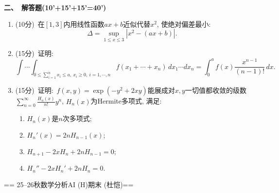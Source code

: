 \textbf{二、\ 解答题(10'+15'+15'=40')}
\begin{enumerate}
    \item (10分)\ 在$[1,3]$内用线性函数$ax+b$近似代替$x^2$, 使绝对偏差最小:
    $$\Delta=\sup_{1\leq x\leq3}|x^2-(ax+b)|.$$
    \item (15分)\ 证明:
    $$\int\cdots\int_{0\leq\sum_{i=1}^{n}x_i\leq a,\ x_i\geq0,\ i=1,\cdots,n}f(x_1+\cdots+x_n)\,dx_1\cdots dx_n=\int_0^af(x)\dfrac{x^{n-1}}{(n-1)!}\,dx.$$
    \item (15分)\ 证明:\ $f(x,y)=\exp(-y^2+2xy)$能展成对$x,y$一切值都收敛的级数$\displaystyle\sum_{n=0}^{\infty}\frac{H_n(x)}{n!}y^n$, $H_n(x)$为Hermite多项式, 满足:
    \begin{enumerate}[label=(\arabic*)]
        \item $H_n(x)$是$n$次多项式;
        \item $H_n'(x)=2nH_{n-1}(x)$;
        \item $H_{n+1}-2xH_n+2nH_{n-1}=0$;
        \item $H_n''-2xH_n'+2nH_n=0$.
    \end{enumerate}
\end{enumerate}

== 25--26秋数学分析AI (H)期末 (杜恺)==

